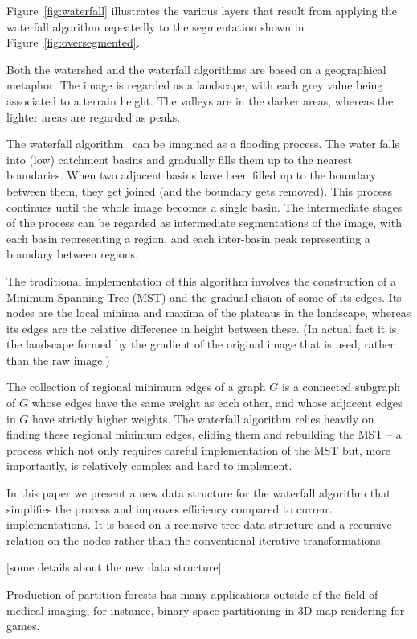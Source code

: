 \documentclass[a4paper]{article}
\begin{document}
Figure~\ref{fig:waterfall} illustrates the various layers that result
from applying the waterfall algorithm repeatedly to the segmentation
shown in Figure~\ref{fig:oversegmented}.

Both the watershed and the waterfall algorithms are based on a
geographical metaphor. The image is regarded as a landscape, with each
grey value being associated to a terrain height. The valleys are in
the darker areas, whereas the lighter areas are regarded as peaks.

The waterfall algorithm~\cite{beucher, marcotegui} can be imagined as a flooding
process. The water falls into (low) catchment basins and gradually
fills them up to the nearest boundaries. When two adjacent basins have
been filled up to the boundary between them, they get joined (and the
boundary gets removed). This process continues until the whole image
becomes a single basin. The intermediate stages of the process can be
regarded as intermediate segmentations of the image, with each basin
representing a region, and each inter-basin peak representing a
boundary between regions.

The traditional implementation of this algorithm \cite{marcotegui} involves the
construction of a Minimum Spanning Tree (MST) and the gradual elision
of some of its edges. Its nodes are the local minima and maxima of the
plateaus in the landscape, whereas its edges are the relative
difference in height between these. (In actual fact it is the
landscape formed by the gradient of the original image that is used,
rather than the raw image.)

The collection of regional minimum edges of a graph $G$ is a connected
subgraph of $G$ whose edges have the same weight as each other, and
whose adjacent edges in $G$ have strictly higher weights. The
waterfall algorithm relies heavily on finding these regional minimum
edges, eliding them and rebuilding the MST -- a process which not only
requires careful implementation of the MST but, more importantly, is
relatively complex and hard to implement.

In this paper we present a new data structure for the waterfall
algorithm that simplifies the process and improves efficiency compared
to current implementations. It is based on a recursive-tree data
structure and a recursive relation on the nodes rather than the
conventional iterative transformations.

[some details about the new data structure]

Production of partition forests has many applications outside of the
field of medical imaging, for instance, binary space partitioning in
3D map rendering for games.
\end{document}

